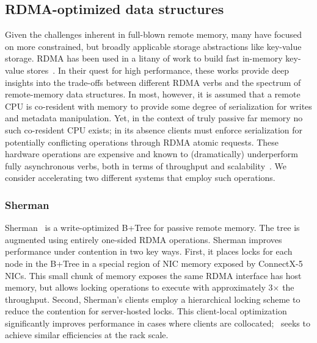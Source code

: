 \subsection{RDMA-optimized data structures}

Given the challenges inherent in full-blown remote memory, many have
focused on more constrained, but broadly applicable storage
abstractions like key-value storage.  RDMA has been used in a litany
of work to build fast in-memory key-value
stores~\cite{farm,MemC3,herd,pilaf,sonuma,storm}. In their quest for
high performance, these works provide deep insights into the
trade-offs between different RDMA verbs and the spectrum of
remote-memory data structures. In most, however, it is assumed that a
remote CPU is co-resident with memory to provide some degree of
serialization for writes and metadata manipulation. Yet, in the
context of truly passive far memory no such co-resident CPU exists;
in its absence clients must enforce serialization for potentially
conflicting operations through RDMA atomic requests. These
hardware operations are expensive and known to (dramatically)
underperform fully asynchronous verbs, both in terms of throughput and
scalability~\cite{design-guidelines}.  We consider accelerating two
different systems that employ such operations.

\subsubsection{Sherman}

Sherman~\cite{sherman} is a write-optimized B+Tree for passive remote memory. The
tree is augmented using entirely one-sided RDMA operations. Sherman
improves performance under contention in two key ways. First, it
places locks for each node in the B+Tree in a special region of NIC
memory exposed by ConnectX-5 NICs.  This small chunk of memory exposes
the same RDMA interface has host memory, but allows locking operations
to execute with approximately 3$\times$ the throughput.  Second,
Sherman's clients employ a hierarchical locking scheme to reduce the
contention for server-hosted locks.  This client-local optimization
significantly improves performance in cases where clients are
collocated; \sword\ seeks to achieve similar efficiencies at the rack
scale.





